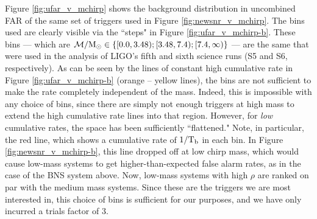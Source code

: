 Figure \ref{fig:ufar_v_mchirp} shows the background distribution in uncombined \ac{FAR} of the same set of triggers used in Figure \ref{fig:newsnr_v_mchirp}. The bins used are clearly visible via the ``steps" in Figure \ref{fig:ufar_v_mchirp-b}. These bins --- which are $\mathcal{M}/\mathrm{M_\odot} \in \{ [0.0, 3.48); [3.48, 7.4); [7.4,\infty) \}$ --- are the same that were used in the analysis of LIGO's fifth and sixth science runs (S5 and S6, respectively). As can be seen by the lines of constant high cumulative rate in Figure \ref{fig:ufar_v_mchirp-b} (orange -- yellow lines), the bins are not sufficient to make the rate completely independent of the mass. Indeed, this is impossible with any choice of bins, since there are simply not enough triggers at high mass to extend the high cumulative rate lines into that region. However, for \emph{low} cumulative rates, the space has been sufficiently ``flattened." Note, in particular, the red line, which shows a cumulative rate of $1/\mathrm{T_b}$ in each bin. In Figure \ref{fig:newsnr_v_mchirp-b}, this line dropped off at low chirp mass, which would cause low-mass systems to get higher-than-expected false alarm rates, as in the case of the \ac{BNS} system above. Now, low-mass systems with high $\rho$ are ranked on par with the medium mass systems. Since these are the triggers we are most interested in, this choice of bins is sufficient for our purposes, and we have only incurred a trials factor of 3.

